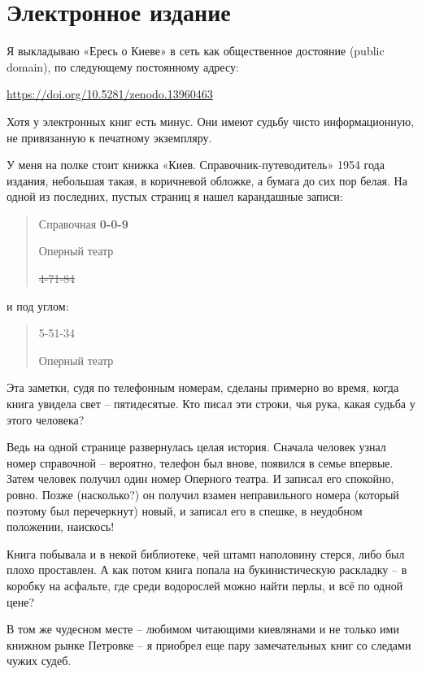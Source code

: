 \section*{Электронное издание} 

Я выкладываю «Ересь о Киеве» в сеть как общественное достояние (public domain), по следующему постоянному адресу:

\href{https://doi.org/10.5281/zenodo.13960463}{https://doi.org/10.5281/zenodo.13960463}

Хотя у электронных книг есть минус. Они имеют судьбу чисто информационную, не привязанную к печатному экземпляру.

У меня на полке стоит книжка «Киев. Справочник-пут\-еводи\-тель» 1954 года издания, небольшая такая, в коричневой обложке, а бумага до сих пор белая. На одной из последних, пустых страниц я нашел карандашные записи:

\begin{quotation}
Справочная \textbf{0-0-9}

Оперный театр

\sout{4-71-84}
\end{quotation}

и под углом:

\begin{quotation}
5-51-34

Оперный театр
\end{quotation}

Эта заметки, судя по телефонным номерам, сделаны примерно во время, когда книга увидела свет – пятидесятые. Кто писал эти строки, чья рука, какая судьба у этого человека? 

Ведь на одной странице развернулась целая история. Сначала человек узнал номер справочной – вероятно, телефон был внове, появился в семье впервые. Затем человек получил один номер Оперного театра. И записал его спокойно, ровно. Позже (насколько?) он получил взамен неправильного номера (который поэтому был перечеркнут) новый, и записал его в спешке, в неудобном положении, наискось!

Книга побывала и в некой библиотеке, чей штамп наполовину стерся, либо был плохо проставлен. А как потом книга попала на букинистическую раскладку – в коробку на асфальте, где среди водорослей можно найти перлы, и всё по одной цене?

В том же чудесном месте – любимом читающими киевлянами и не только ими книжном рынке Петровке – я приобрел еще пару замечательных книг со следами чужих судеб.


